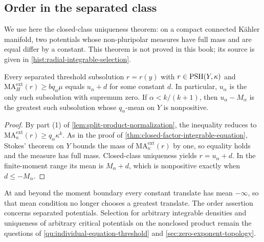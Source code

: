\subsection{Order in the separated class}

We use here the closed-class uniqueness theorem: on a compact connected K\"ahler manifold, two potentials whose non-pluripolar measures have full mass and are equal differ by a constant. This theorem is not proved in this book; its source is given in \cref{hist:radial-integrable-selection}.

\begin{corollary}\label{cor:radial-separated-critical-order}
Every separated threshold subsolution $r=r(y)$ with $r\in\mathrm{PSH}(Y,\kappa)$ and $\mathrm{MA}^{\mathrm{ext}}_H(r)\geq bq_\alpha\mu$ equals $u_\alpha+d$ for some constant $d$. In particular, $u_\alpha$ is the only such subsolution with supremum zero. If $\alpha<k/(k+1)$, then $u_\alpha-M_\alpha$ is the greatest such subsolution whose $q_\alpha$-mean on $Y$ is nonpositive.
\end{corollary}
\begin{proof}
By part (1) of \cref{lem:split-product-normalization}, the inequality reduces to $\mathrm{MA}^{\mathrm{ext}}_\kappa(r)\geq q_\alpha\kappa^k$. As in the proof of \cref{thm:closed-factor-integrable-equation}, Stokes' theorem on $Y$ bounds the mass of $\mathrm{MA}^{\mathrm{ext}}_\kappa(r)$ by one, so equality holds and the measure has full mass. Closed-class uniqueness yields $r=u_\alpha+d$. In the finite-moment range its mean is $M_\alpha+d$, which is nonpositive exactly when $d\leq-M_\alpha$.
\end{proof}

At and beyond the moment boundary every constant translate has mean $-\infty$, so that mean condition no longer chooses a greatest translate. The order assertion concerns separated potentials. Selection for arbitrary integrable densities and uniqueness of arbitrary critical potentials on the nonclosed product remain the questions of \cref{qu:individual-equation-threshold} and \cref{sec:zero-exponent-topology}.
